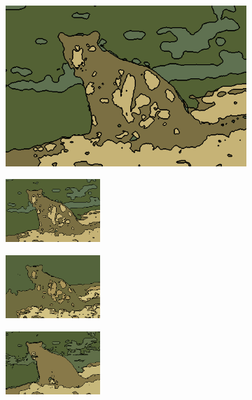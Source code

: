 \documentclass[journal]{IEEEtran}
\begin{document}
\begin{figure}[!t]
          
    \begin{subfigure}[b]{\textwidth+20pt\relax}
    	\centering
    	\includegraphics[width=\dimexpr\linewidth-20pt\relax]{160067_KMeans_const_segm_LAB} 
    \end{subfigure}      
    \begin{subfigure}[b]{0.23\textwidth}
    	\centering
        \includegraphics[height=67.68857pt]{160067_MiniBatchKMeans_const_segm_LAB}
    \end{subfigure}
    \begin{subfigure}[b]{0.23\textwidth}
    	\centering
        \includegraphics[height=67.68857pt]{160067_Birch_const_segm_LAB}
    \end{subfigure}
    \begin{subfigure}[b]{0.23\textwidth}
    	\centering
        \includegraphics[height=67.68857pt]{160067_GaussianMixture_const_segm_HSV}
    \end{subfigure} \\ \vspace{-5pt}
    

\end{figure}
\end{document}
